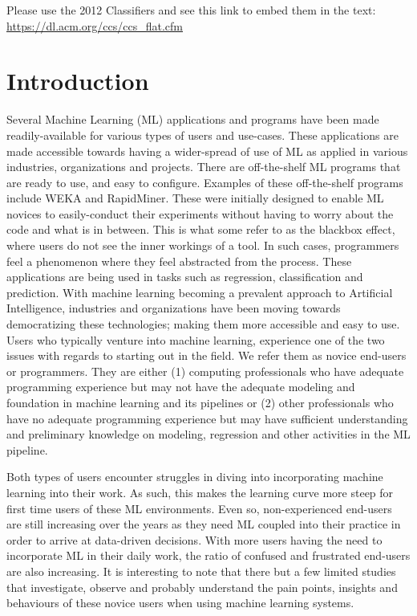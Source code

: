 \documentclass{sigchi}
\def\plainkeywords{devops; novice programmers; programmer support}
\begin{document}

\keywords{\plainkeywords}

\printccsdesc
Please use the 2012 Classifiers and see this link to embed them in the text: \url{https://dl.acm.org/ccs/ccs_flat.cfm}

\section{Introduction}
Several Machine Learning (ML) applications and programs have been made readily-available for various types of users and use-cases. These applications are made accessible towards having a wider-spread of use of ML as applied in various industries, organizations and projects. There are off-the-shelf ML programs that are ready to use, and easy to configure. Examples of these off-the-shelf programs include WEKA and RapidMiner. These were initially designed to enable ML novices to easily-conduct their experiments without having to worry about the code and what is in between. This is what some refer to as the blackbox effect, where users do not see the inner workings of a tool. In such cases, programmers feel a phenomenon where they feel abstracted from the process.  These applications are being used in tasks such as regression, classification and prediction. With machine learning becoming a prevalent approach to Artificial Intelligence, industries and organizations have been moving towards democratizing these technologies; making them more accessible and easy to use. Users who typically venture into machine learning, experience one of the two issues with regards to starting out in the field. We refer them as novice end-users or programmers. They are either (1) computing professionals who have adequate programming experience but may not have the adequate modeling and foundation in machine learning and its pipelines or (2) other professionals who have no adequate programming experience but may have sufficient understanding and preliminary knowledge on modeling, regression and other activities in the ML pipeline.

Both types of users encounter struggles in diving into incorporating machine learning into their work. As such, this makes the learning curve more steep for first time users of these ML environments. Even so, non-experienced end-users are still increasing over the years as they need ML coupled into their practice in order to arrive at data-driven decisions. With more users having the need to incorporate ML in their daily work, the ratio of confused and frustrated end-users are also increasing. It is interesting to note that there but a few limited studies that investigate, observe and probably understand the pain points, insights and behaviours of these novice users when using machine learning systems.
\end{document}
